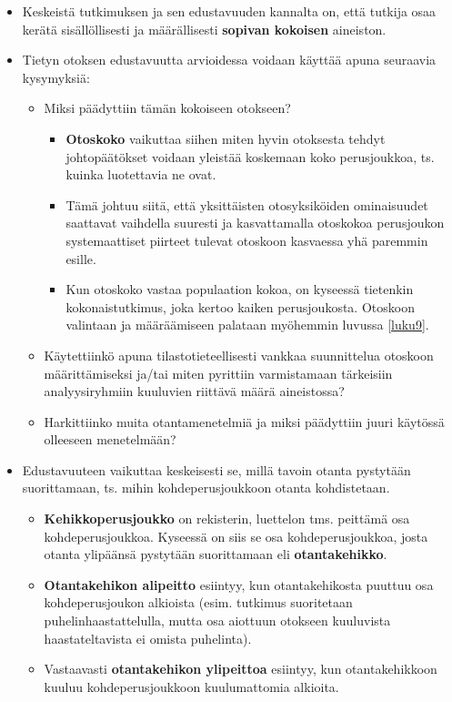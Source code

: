 \documentclass[
]{book}
\providecommand{\tightlist}{%
  \setlength{\itemsep}{0pt}\setlength{\parskip}{0pt}}
\begin{document}
\begin{itemize}
\tightlist
\item
  Keskeistä tutkimuksen ja sen edustavuuden kannalta on, että tutkija osaa kerätä sisällöllisesti ja määrällisesti \textbf{sopivan kokoisen} aineiston.
\item
  Tietyn otoksen edustavuutta arvioidessa voidaan käyttää apuna seuraavia kysymyksiä:

  \begin{itemize}
  \tightlist
  \item
    Miksi päädyttiin tämän kokoiseen otokseen?

    \begin{itemize}
    \tightlist
    \item
      \textbf{Otoskoko} vaikuttaa siihen miten hyvin otoksesta tehdyt johtopäätökset voidaan yleistää koskemaan koko perusjoukkoa, ts. kuinka luotettavia ne ovat.
    \item
      Tämä johtuu siitä, että yksittäisten otosyksiköiden ominaisuudet saattavat vaihdella suuresti ja kasvattamalla otoskokoa perusjoukon systemaattiset piirteet tulevat otoskoon kasvaessa yhä paremmin esille.
    \item
      Kun otoskoko vastaa populaation kokoa, on kyseessä tietenkin kokonaistutkimus, joka kertoo kaiken perusjoukosta. Otoskoon valintaan ja määräämiseen palataan myöhemmin luvussa \ref{luku9}.
    \end{itemize}
  \item
    Käytettiinkö apuna tilastotieteellisesti vankkaa suunnittelua otoskoon määrittämiseksi ja/tai miten pyrittiin varmistamaan tärkeisiin analyysiryhmiin kuuluvien riittävä määrä aineistossa?
  \item
    Harkittiinko muita otantamenetelmiä ja miksi päädyttiin juuri käytössä olleeseen menetelmään?
  \end{itemize}
\item
  Edustavuuteen vaikuttaa keskeisesti se, millä tavoin otanta pystytään suorittamaan, ts. mihin kohdeperusjoukkoon otanta kohdistetaan.

  \begin{itemize}
  \tightlist
  \item
    \textbf{Kehikkoperusjoukko} on rekisterin, luettelon tms. peittämä osa kohdeperusjoukkoa. Kyseessä on siis se osa kohdeperusjoukkoa, josta otanta ylipäänsä pystytään suorittamaan eli \textbf{otantakehikko}.
  \item
    \textbf{Otantakehikon alipeitto} esiintyy, kun otantakehikosta puuttuu osa kohdeperusjoukon alkioista (esim. tutkimus suoritetaan puhelinhaastattelulla, mutta osa aiottuun otokseen kuuluvista haastateltavista ei omista puhelinta).
  \item
    Vastaavasti \textbf{otantakehikon ylipeittoa} esiintyy, kun otantakehikkoon kuuluu kohdeperusjoukkoon kuulumattomia alkioita.


\end{itemize}
\end{itemize}
\end{document}
